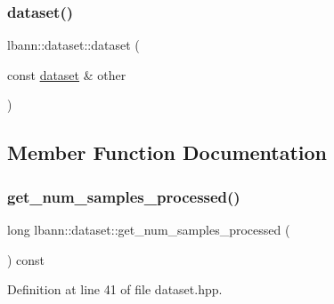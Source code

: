 \subsubsection{\texorpdfstring{dataset()}{dataset()}\hspace{0.1cm}{\footnotesize\ttfamily [2/2]}}
{\footnotesize\ttfamily lbann\+::dataset\+::dataset (\begin{DoxyParamCaption}\item[{const \hyperlink{classlbann_1_1dataset}{dataset} \&}]{other }\end{DoxyParamCaption})\hspace{0.3cm}{\ttfamily [default]}}



\subsection{Member Function Documentation}
\mbox{\label{classlbann_1_1dataset_a73496347a477a5ebb0dbf30140295026}} 
\subsubsection{\texorpdfstring{get\+\_\+num\+\_\+samples\+\_\+processed()}{get\_num\_samples\_processed()}}
{\footnotesize\ttfamily long lbann\+::dataset\+::get\+\_\+num\+\_\+samples\+\_\+processed (\begin{DoxyParamCaption}{ }\end{DoxyParamCaption}) const\hspace{0.3cm}{\ttfamily [inline]}}



Definition at line 41 of file dataset.\+hpp.


